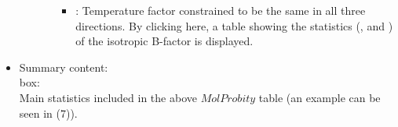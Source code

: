 \begin{itemize}
\begin{itemize}
\begin{itemize}
          \begin{itemize}
           \item {}: Temperature factor constrained to be the same in all three directions. By clicking here, a table showing the statistics (,  and ) of the isotropic B-factor is displayed.
          \end{itemize}
        \end{itemize}
    \end{itemize}
    
 \item Summary content:\\
 
   box:\\Main statistics included in the above $MolProbity$  table (an example can be seen in  (7)).

\end{itemize}
